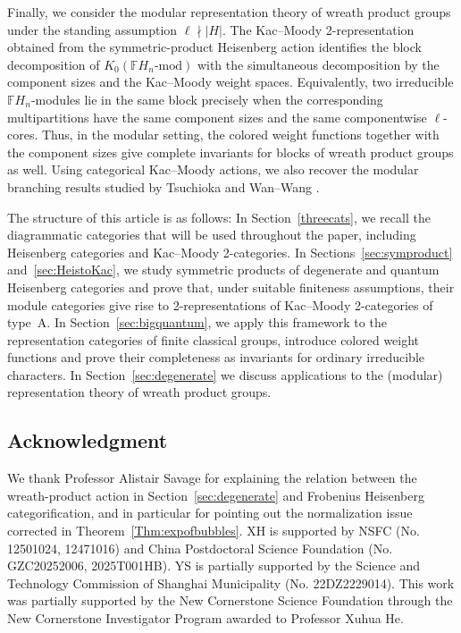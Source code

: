 \documentclass[12pt]{amsart}
\numberwithin{itemcounter}{subsection}
\theoremstyle{plain}
\theoremstyle{definition}
\theoremstyle{remark}
\numberwithin{equation}{section}
\def\bbF{\mathbb{F}}
\begin{document}
Finally, we consider the modular representation theory of wreath product
groups under the standing assumption $\ell\nmid |H|$. The Kac--Moody
2-representation obtained from the symmetric-product Heisenberg action
identifies the block decomposition of
\(
    K_0(\bbF H_n\text{-mod})
\)
with the simultaneous decomposition by the component sizes and the Kac--Moody weight spaces. Equivalently, two
irreducible $\bbF H_n$-modules lie in the same block precisely when the
corresponding multipartitions have the same component sizes and the same componentwise $\ell$-cores. Thus, in the modular
setting, the colored weight functions together with the component sizes give complete invariants for blocks of
wreath product groups as well. Using categorical Kac--Moody actions, we also recover the modular branching results studied by Tsuchioka \cite{Tsu07} and Wan--Wang \cite{WW08}.



The structure of this article is as follows: In Section~\ref{threecats}, we recall the diagrammatic categories that will be used throughout the paper, including Heisenberg categories and Kac--Moody 2-categories. In
Sections~\ref{sec:symproduct} and~\ref{sec:HeistoKac}, we study symmetric
products of degenerate and quantum Heisenberg categories and prove that, under suitable finiteness assumptions, their module categories give rise to 2-representations of Kac--Moody 2-categories of type~A. In
Section~\ref{sec:bigquantum}, we apply this framework to the representation categories of finite classical groups, introduce colored weight functions and prove their completeness as invariants for ordinary irreducible characters. In Section~\ref{sec:degenerate} we discuss applications to the (modular) representation theory of wreath product groups.
    
\subsection*{Acknowledgment}
We thank Professor Alistair Savage for explaining the relation between the wreath-product action in Section~\ref{sec:degenerate} and Frobenius Heisenberg categorification, and in particular for pointing out the normalization issue corrected in Theorem~\ref{Thm:expofbubbles}.
XH is supported by NSFC (No. 12501024, 12471016) and China Postdoctoral Science Foundation (No. GZC20252006, 2025T001HB).
YS is partially supported by the Science and Technology Commission of Shanghai Municipality (No. 22DZ2229014).
This work was partially supported by the New Cornerstone Science Foundation through the New Cornerstone Investigator Program awarded to Professor Xuhua He.
\end{document}
